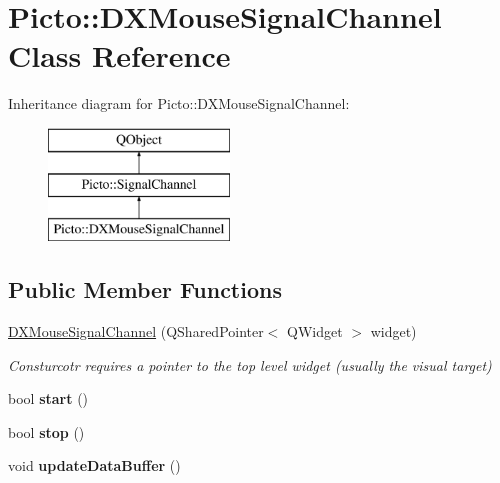 \hypertarget{class_picto_1_1_d_x_mouse_signal_channel}{\section{Picto\-:\-:D\-X\-Mouse\-Signal\-Channel Class Reference}
\label{class_picto_1_1_d_x_mouse_signal_channel}
}
Inheritance diagram for Picto\-:\-:D\-X\-Mouse\-Signal\-Channel\-:\begin{figure}[H]
\begin{center}
\leavevmode
\includegraphics[height=3.000000cm]{class_picto_1_1_d_x_mouse_signal_channel}
\end{center}
\end{figure}
\subsection*{Public Member Functions}
\begin{DoxyCompactItemize}
\item 
\hypertarget{class_picto_1_1_d_x_mouse_signal_channel_abc9914dab2038c9912161a751e21b0d1}{\hyperlink{class_picto_1_1_d_x_mouse_signal_channel_abc9914dab2038c9912161a751e21b0d1}{D\-X\-Mouse\-Signal\-Channel} (Q\-Shared\-Pointer$<$ Q\-Widget $>$ widget)}\label{class_picto_1_1_d_x_mouse_signal_channel_abc9914dab2038c9912161a751e21b0d1}

\begin{DoxyCompactList}\small\item\em Consturcotr requires a pointer to the top level widget (usually the visual target) \end{DoxyCompactList}\item 
\hypertarget{class_picto_1_1_d_x_mouse_signal_channel_a850627134aa2a372b25e7cdcd6ad5f04}{bool {\bfseries start} ()}\label{class_picto_1_1_d_x_mouse_signal_channel_a850627134aa2a372b25e7cdcd6ad5f04}

\item 
\hypertarget{class_picto_1_1_d_x_mouse_signal_channel_a4650ed00645d00a22034e4a7f1434c80}{bool {\bfseries stop} ()}\label{class_picto_1_1_d_x_mouse_signal_channel_a4650ed00645d00a22034e4a7f1434c80}

\item 
\hypertarget{class_picto_1_1_d_x_mouse_signal_channel_ac6a71361ec406c7d81d87c570260b567}{void {\bfseries update\-Data\-Buffer} ()}\label{class_picto_1_1_d_x_mouse_signal_channel_ac6a71361ec406c7d81d87c570260b567}

\end{DoxyCompactItemize}
